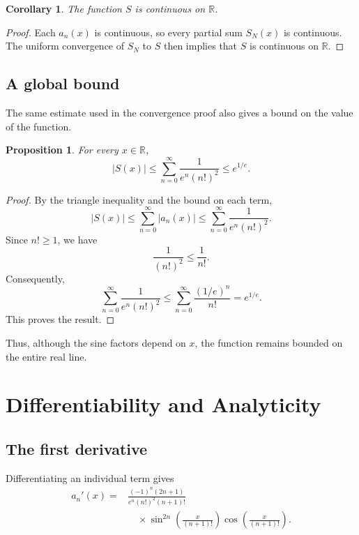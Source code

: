 \documentclass[12pt]{article}
\newtheorem{proposition}[theorem]{Proposition}
\newtheorem{corollary}[theorem]{Corollary}
\theoremstyle{definition}
\theoremstyle{remark}
\begin{document}
\begin{corollary}
The function \(S\) is continuous on \(\mathbb{R}\).
\end{corollary}

\begin{proof}
Each \(a_n(x)\) is continuous, so every partial sum \(S_N(x)\)
is continuous. The uniform convergence of \(S_N\) to \(S\)
then implies that \(S\) is continuous on \(\mathbb{R}\).
\end{proof}

\subsection{A global bound}

The same estimate used in the convergence proof also gives
a bound on the value of the function.

\begin{proposition}
For every \(x\in\mathbb{R}\),
\[
|S(x)|\leq
\sum_{n=0}^{\infty}\frac{1}{e^n(n!)^2}
\leq e^{1/e}.
\]
\end{proposition}

\begin{proof}
By the triangle inequality and the bound on each term,
\[
|S(x)|\leq
\sum_{n=0}^{\infty}|a_n(x)|
\leq
\sum_{n=0}^{\infty}\frac{1}{e^n(n!)^2}.
\]
Since \(n!\geq 1\), we have
\[
\frac{1}{(n!)^2}\leq\frac{1}{n!}.
\]
Consequently,
\[
\sum_{n=0}^{\infty}\frac{1}{e^n(n!)^2}
\leq
\sum_{n=0}^{\infty}\frac{(1/e)^n}{n!}
=e^{1/e}.
\]
This proves the result.
\end{proof}

Thus, although the sine factors depend on \(x\), the function
remains bounded on the entire real line.

\section{Differentiability and Analyticity}

\subsection{The first derivative}

Differentiating an individual term gives
\begin{align}
a_n'(x)
={}&
\frac{(-1)^n(2n+1)}
{e^n(n!)^2(n+1)!}
\nonumber\\
&\quad{}\times
\sin^{2n}\left(\frac{x}{(n+1)!}\right)
\cos\left(\frac{x}{(n+1)!}\right).
\label{eq:first-derivative}
\end{align}
\end{document}
